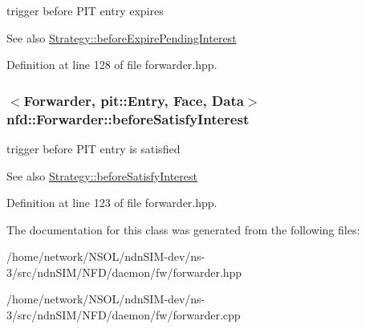 trigger before P\+IT entry expires 

\begin{DoxySeeAlso}{See also}
\hyperlink{classnfd_1_1fw_1_1Strategy_a16f330a517d2df19a80c4b74e8685b28}{Strategy\+::before\+Expire\+Pending\+Interest} 
\end{DoxySeeAlso}


Definition at line 128 of file forwarder.\+hpp.

\subsubsection[{\texorpdfstring{before\+Satisfy\+Interest}{beforeSatisfyInterest}}]{$<${\bf Forwarder}, {\bf pit\+::\+Entry}, {\bf Face}, {\bf Data}$>$ nfd\+::\+Forwarder\+::before\+Satisfy\+Interest}\hypertarget{classnfd_1_1Forwarder_a32566fb05aa466ad3882221453ee28db}{}\label{classnfd_1_1Forwarder_a32566fb05aa466ad3882221453ee28db}


trigger before P\+IT entry is satisfied 

\begin{DoxySeeAlso}{See also}
\hyperlink{classnfd_1_1fw_1_1Strategy_a31387ec5c8204841e407bced9902c203}{Strategy\+::before\+Satisfy\+Interest} 
\end{DoxySeeAlso}


Definition at line 123 of file forwarder.\+hpp.



The documentation for this class was generated from the following files\+:\begin{DoxyCompactItemize}
\item 
/home/network/\+N\+S\+O\+L/ndn\+S\+I\+M-\/dev/ns-\/3/src/ndn\+S\+I\+M/\+N\+F\+D/daemon/fw/forwarder.\+hpp\item 
/home/network/\+N\+S\+O\+L/ndn\+S\+I\+M-\/dev/ns-\/3/src/ndn\+S\+I\+M/\+N\+F\+D/daemon/fw/forwarder.\+cpp\end{DoxyCompactItemize}
